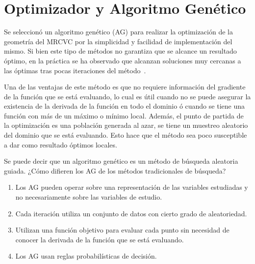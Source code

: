 

\section{Optimizador y Algoritmo Genético}
%
%

Se seleccionó un algoritmo genético (AG) para realizar la optimización de la
geometría del MRCVC por la simplicidad y facilidad de implementación del mismo.
%
Si bien este tipo de métodos no garantiza que se alcance un resultado óptimo,
en la práctica se ha observado que alcanzan soluciones muy cercanas a las
óptimas tras pocas iteraciones del método~\parencite{goldberg}\parencite{shi}.

Una de las ventajas de este método es que no requiere información del gradiente
de la función que se está evaluando, lo cual es útil cuando no se puede asegurar
la existencia de la derivada de la función en todo el dominio ó cuando se tiene
una función con más de un máximo o mínimo local.
%
Además, el punto de partida de la optimización es una población generada al
azar, se tiene un muestreo aleatorio del dominio que se está evaluando.
%
Esto hace que el método sea poco susceptible a dar como resultado óptimos
locales.

Se puede decir que un algoritmo genético es un método de búsqueda aleatoria
guiada.
%
¿Cómo difieren los AG de los métodos tradicionales de búsqueda?
%
\begin{enumerate}
  \item Los AG pueden operar sobre una representación de las variables estudiadas y
no necesariamente sobre las variables de estudio.
  \item Cada iteración utiliza un conjunto de datos con cierto grado de
aleatoriedad.
  \item Utilizan una función objetivo para evaluar cada punto sin necesidad de
conocer la derivada de la función que se está evaluando.
  \item Los AG usan reglas probabilísticas de decisión.
\end{enumerate}


